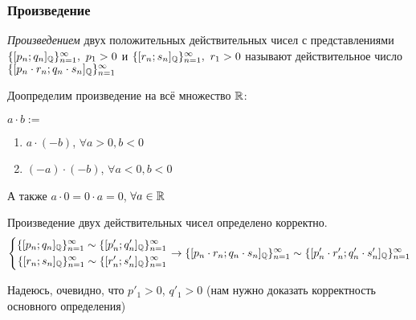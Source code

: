 \subsubsection{Произведение}

\begin{definition}
    \textit{Произведением} двух положительных действительных чисел с представлениями $\{[p_n;q_n]_{\mathbb{Q}}\}_{n = 1}^\infty,\ p_1 > 0$ и $\{[r_n;s_n]_{\mathbb{Q}}\}_{n = 1}^\infty,\ r_1 > 0$ называют действительное число $\{[p_n \cdot r_n;q_n \cdot s_n]_{\mathbb{Q}}\}_{n = 1}^\infty$
\end{definition}

Доопределим произведение на всё множество $\mathbb{R}$:

$a \cdot b :=$
\begin{enumerate}
    \item $a \cdot (-b)$, $\forall a > 0, b < 0$
    \item $(-a) \cdot (-b)$, $\forall a < 0, b < 0$
\end{enumerate}

А также $a \cdot 0 = 0 \cdot a = 0$, $\forall a \in \mathbb{R}$

\begin{proposition}
    Произведение двух действительных чисел определено корректно.
    $$
        \left\{\begin{aligned}\{[p_n; q_n]_{\mathbb{Q}}\}_{n = 1}^\infty \sim \{[p'_n; q'_n]_{\mathbb{Q}}\}_{n = 1}^\infty \\ 
            \{[r_n; s_n]_{\mathbb{Q}}\}_{n = 1}^\infty \sim \{[r'_n; s'_n]_{\mathbb{Q}}\}_{n = 1}^\infty\end{aligned}\right.
    \rightarrow
    \{[p_n \cdot r_n; q_n \cdot s_n]_{\mathbb{Q}}\}_{n = 1}^\infty \sim \{[p'_n \cdot r'_n; q'_n \cdot s'_n]_{\mathbb{Q}}\}_{n = 1}^\infty
    $$
\end{proposition}

\begin{anote}
    Надеюсь, очевидно, что $p'_1 > 0$, $q'_1 > 0$ (нам нужно доказать корректность основного определения)
\end{anote}

